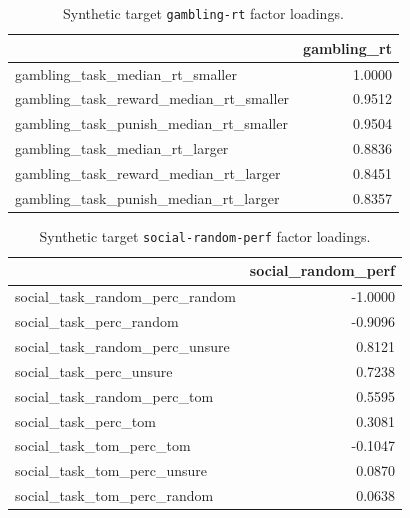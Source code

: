 \documentclass{article}
\begin{document}
\begin{table}[H]
\centering
\begin{tabular}{lr}
\toprule
 & gambling\_rt \\
\midrule
gambling\_task\_median\_rt\_smaller & 1.0000 \\
gambling\_task\_reward\_median\_rt\_smaller & 0.9512 \\
gambling\_task\_punish\_median\_rt\_smaller & 0.9504 \\
gambling\_task\_median\_rt\_larger & 0.8836 \\
gambling\_task\_reward\_median\_rt\_larger & 0.8451 \\
gambling\_task\_punish\_median\_rt\_larger & 0.8357 \\
\bottomrule
\end{tabular}

\footnotesize
\caption{Synthetic target \texttt{gambling-rt} factor loadings.}
\normalsize
\label{tab:gambling-rt}
\end{table}


\begin{table}[H]
\centering
\begin{tabular}{lr}
\toprule
 & social\_random\_perf \\
\midrule
social\_task\_random\_perc\_random & -1.0000 \\
social\_task\_perc\_random & -0.9096 \\
social\_task\_random\_perc\_unsure & 0.8121 \\
social\_task\_perc\_unsure & 0.7238 \\
social\_task\_random\_perc\_tom & 0.5595 \\
social\_task\_perc\_tom & 0.3081 \\
social\_task\_tom\_perc\_tom & -0.1047 \\
social\_task\_tom\_perc\_unsure & 0.0870 \\
social\_task\_tom\_perc\_random & 0.0638 \\
\bottomrule
\end{tabular}

\footnotesize
\caption{Synthetic target \texttt{social-random-perf} factor loadings.}
\normalsize
\label{tab:social-random-perf}
\end{table}
\end{document}
